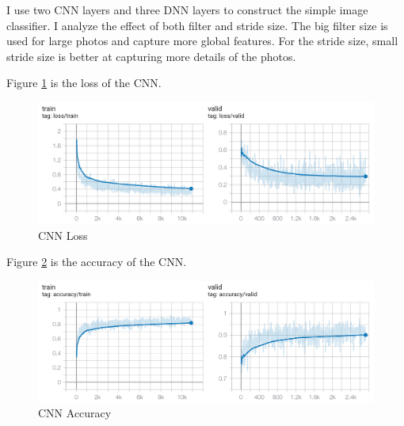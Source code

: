 \documentclass{../../Latex_Template/Homework/homework}
\begin{document}
\maketitle

  \begin{arabicparts}
    \questionpart
    I use two CNN layers and three DNN layers to construct the simple image
    classifier. I analyze the effect of both filter and stride size. The big
    filter size is used for large photos and capture more global features. For
    the stride size, small stride size is better at capturing more details of
    the photos.

    \questionpart 
    Figure \ref{fig:cnn_loss} is the loss of the CNN.
    \begin{figure}[H]
      \begin{center}
        \includegraphics[width=0.5\linewidth]{CNN_loss.png}
        \caption{CNN Loss}
        \label{fig:cnn_loss}
      \end{center}
    \end{figure}

    Figure \ref{fig:cnn_accuracy} is the accuracy of the CNN.
    \begin{figure}[H]
      \begin{center}
        \includegraphics[width=0.5\linewidth]{CNN_accuracy.png}
        \caption{CNN Accuracy}
        \label{fig:cnn_accuracy}
      \end{center}
    \end{figure}

    \newpage


\end{arabicparts}
\end{document}

